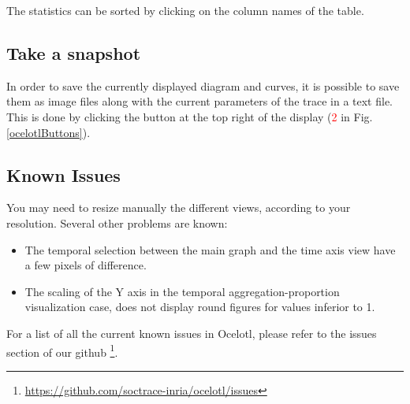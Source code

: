 \documentclass[twoside]{article}
\begin{document}
\begin{sloppypar}
The statistics can be sorted by clicking on the column names of the table.

\subsection{Take a snapshot}
In order to save the currently displayed diagram and curves, it is possible to save them as image files along with the current parameters of the trace in a text file. This is done by clicking the button at the top right of the display (\textcolor{red}{2} in Fig. \ref{ocelotlButtons}).

\subsection{Known Issues}
You may need to resize manually the different views, according to your resolution. Several other problems are known:
\begin{itemize}
	\item The temporal selection between the main graph and the time axis view have a few pixels of difference.
	\item The scaling of the Y axis in the temporal aggregation-proportion visualization case, does not display round figures for values inferior to 1.
\end{itemize}

For a list of all the current known issues in Ocelotl, please refer to the issues section of our github \footnote{\url{https://github.com/soctrace-inria/ocelotl/issues}}.

\newpage

\newpage

{}

\end{sloppypar} 
\end{document}
